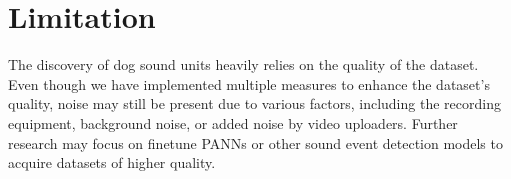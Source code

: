 \section*{Limitation}

The discovery of dog sound units heavily relies on the quality of the dataset. 
Even though we have implemented multiple measures to enhance the dataset's quality, noise may still be present due to various factors, including the recording equipment, background noise, or added noise by video uploaders. 
Further research may focus on finetune PANNs or other sound event detection models to acquire datasets of higher quality.

